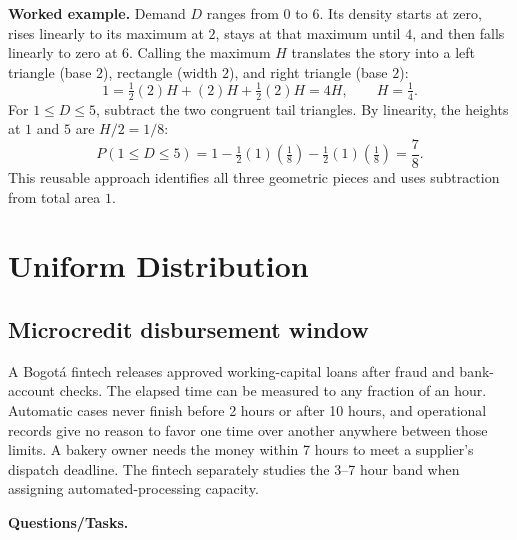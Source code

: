 \textbf{Worked example.} Demand $D$ ranges from $0$ to $6$.  Its density starts
at zero, rises linearly to its maximum at $2$, stays at that maximum until
$4$, and then falls linearly to zero at $6$.  Calling the maximum $H$
translates the story into a left triangle
(base $2$), rectangle (width $2$), and right triangle (base $2$):
\[
 1=\tfrac12(2)H+(2)H+\tfrac12(2)H=4H,
 \qquad H=\tfrac14.
\]
For $1\le D\le5$, subtract the two congruent tail triangles.  By linearity,
the heights at $1$ and $5$ are $H/2=1/8$:
\[
 P(1\le D\le5)=1-\tfrac12(1)(\tfrac18)-\tfrac12(1)(\tfrac18)=\frac78.
\]
This reusable approach identifies all three geometric pieces and uses
subtraction from total area $1$.

\section{Uniform Distribution}\label{sec:c2-uniform-practice}

\subsection{Microcredit disbursement window}\label{sec:c2-uniform-service}
A Bogotá fintech releases approved working-capital loans after fraud and
bank-account checks.  The elapsed time can be measured to any fraction of an
hour.  Automatic cases never finish before 2 hours or after 10 hours, and
operational records give no reason to favor one time over another anywhere
between those limits.  A bakery owner needs the money within 7 hours to meet a
supplier's dispatch deadline.  The fintech separately studies the 3--7 hour
band when assigning automated-processing capacity.

\begingroup{}
\endgroup

\textbf{Questions/Tasks.}
\begin{enumerate}
\end{enumerate}

